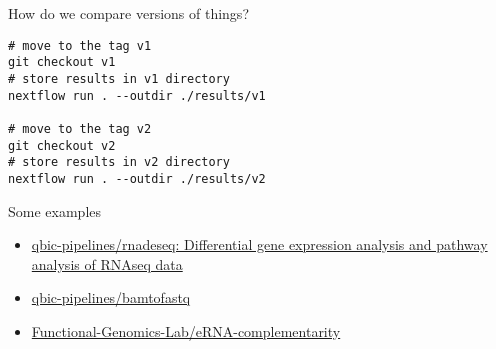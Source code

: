 \documentclass[bigger]{beamer}
\begin{document}
\begin{frame}[label={sec:orgcb9dfdf},fragile,shrink=10]{How do we compare versions of things?}
 \begin{verbatim}
# move to the tag v1
git checkout v1
# store results in v1 directory
nextflow run . --outdir ./results/v1

# move to the tag v2
git checkout v2
# store results in v2 directory
nextflow run . --outdir ./results/v2
\end{verbatim}
\end{frame}

\begin{frame}[label={sec:org41c4f43}]{Some examples}
\begin{itemize}
\item \href{https://github.com/qbic-pipelines/rnadeseq}{qbic-pipelines/rnadeseq: Differential gene expression analysis and pathway analysis of RNAseq data}
\item \href{https://github.com/qbic-pipelines/bamtofastq}{qbic-pipelines/bamtofastq}
\item \href{https://github.com/Functional-Genomics-Lab/eRNA-complementarity}{Functional-Genomics-Lab/eRNA-complementarity}
\end{itemize}
\end{frame}
\end{document}

